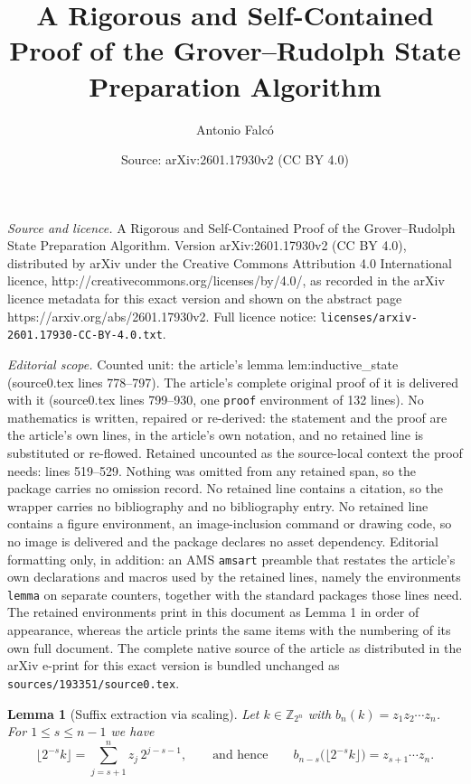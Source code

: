\documentclass[10pt,a4paper]{amsart}
\title{A Rigorous and Self-Contained Proof of the Grover–Rudolph State Preparation Algorithm}
\author{Antonio Falc\'o}
\date{Source: arXiv:2601.17930v2 (CC BY 4.0)}
\newtheorem{lemma}{Lemma}
\begin{document}
\maketitle

\noindent\emph{Source and licence.} A Rigorous and Self-Contained Proof of the Grover–Rudolph State Preparation Algorithm. Version arXiv:2601.17930v2 (CC BY 4.0), distributed by arXiv under the Creative Commons Attribution 4.0 International licence, http://creativecommons.org/licenses/by/4.0/, as recorded in the arXiv licence metadata for this exact version and shown on the abstract page https://arxiv.org/abs/2601.17930v2. Full licence notice: \texttt{licenses/arxiv-2601.17930-CC-BY-4.0.txt}.\par\smallskip

\noindent\textit{Editorial scope.} Counted unit: the article's lemma lem:inductive\_state (source0.tex lines 778--797). The article's complete original proof of it is delivered with it (source0.tex lines 799--930, one \texttt{proof} environment of 132 lines). No mathematics is written, repaired or re-derived: the statement and the proof are the article's own lines, in the article's own notation, and no retained line is substituted or re-flowed.  Retained uncounted as the source-local context the proof needs: lines 519--529.  Nothing was omitted from any retained span, so the package carries no omission record.  No retained line contains a citation, so the wrapper carries no bibliography and no bibliography entry.  No retained line contains a figure environment, an image-inclusion command or drawing code, so no image is delivered and the package declares no asset dependency.  Editorial formatting only, in addition: an AMS \texttt{amsart} preamble that restates the article's own declarations and macros used by the retained lines, namely the environments \texttt{lemma} on separate counters, together with the standard packages those lines need.  The retained environments print in this document as Lemma 1 in order of appearance, whereas the article prints the same items with the numbering of its own full document.  The complete native source of the article as distributed in the arXiv e-print for this exact version is bundled unchanged as \texttt{sources/193351/source0.tex}.
\begin{lemma}[Suffix extraction via scaling]\label{lem:suffix-extraction}
Let $k\in \mathbb{Z}_{2^n}$ with $b_n(k)=z_1z_2\cdots z_n$.
For $1\le s\le n-1$ we have
\[
\Big\lfloor 2^{-s}k\Big\rfloor
=
\sum_{j=s+1}^n z_j\,2^{j-s-1},
\qquad\text{and hence}\qquad
b_{n-s}\!\Big(\lfloor 2^{-s}k\rfloor\Big)=z_{s+1}\cdots z_n.
\]
\end{lemma}
\end{document}

